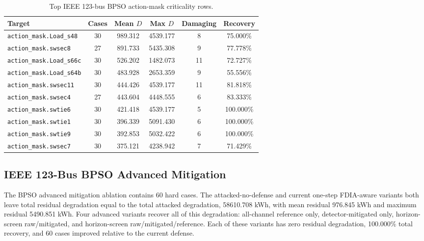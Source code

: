 \begin{table}[t]
\centering
\caption{Top IEEE 123-bus BPSO action-mask criticality rows.}
\label{tab:ieee123_bpso_action_mask_criticality}
\scriptsize
\begin{tabular}{lccccc}
\hline
Target & Cases & Mean $D$ & Max $D$ & Damaging & Recovery \\
\hline
\texttt{action\_mask.Load\_s48} & 30 & 989.312 & 4539.177 & 8 & 75.000\% \\
\texttt{action\_mask.swsec8} & 27 & 891.733 & 5435.308 & 9 & 77.778\% \\
\texttt{action\_mask.Load\_s66c} & 30 & 526.202 & 1482.073 & 11 & 72.727\% \\
\texttt{action\_mask.Load\_s64b} & 30 & 483.928 & 2653.359 & 9 & 55.556\% \\
\texttt{action\_mask.swsec11} & 30 & 444.426 & 4539.177 & 11 & 81.818\% \\
\texttt{action\_mask.swsec4} & 27 & 443.604 & 4448.555 & 6 & 83.333\% \\
\texttt{action\_mask.swtie6} & 30 & 421.418 & 4539.177 & 5 & 100.000\% \\
\texttt{action\_mask.swtie1} & 30 & 396.339 & 5091.430 & 6 & 100.000\% \\
\texttt{action\_mask.swtie9} & 30 & 392.853 & 5032.422 & 6 & 100.000\% \\
\texttt{action\_mask.swsec7} & 30 & 375.121 & 4238.942 & 7 & 71.429\% \\
\hline
\end{tabular}
\end{table}

\subsection{IEEE 123-Bus BPSO Advanced Mitigation}
\label{subsec:ieee123_bpso_advanced_mitigation}

The BPSO advanced mitigation ablation contains 60 hard cases. The attacked-no-defense and current one-step FDIA-aware variants both leave total residual degradation equal to the total attacked degradation, 58610.708 kWh, with mean residual 976.845 kWh and maximum residual 5490.851 kWh. Four advanced variants recover all of this degradation: all-channel reference only, detector-mitigated only, horizon-screen raw/mitigated, and horizon-screen raw/mitigated/reference. Each of these variants has zero residual degradation, 100.000\% total recovery, and 60 cases improved relative to the current defense.

